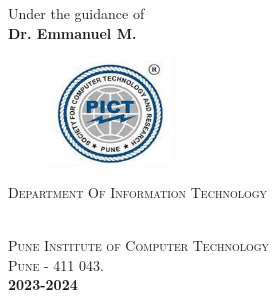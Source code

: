 \documentclass[12pt,a4paper]{report}     %
\begin{document}
	\begin{center}
	    {Under the guidance of }\\
	    {\textbf{Dr. Emmanuel M.}}  %
	\end{center}

		\vspace{0.075in}

	\begin{center}
	  \begin{figure}[h]
			\centering
			\includegraphics[scale=1.5]{pict_logo.png}
		\end{figure}
		\vspace{0.1cm}
	  \begin{large}\textsc {Department Of Information Technology} \end{large}\\
	  \textsc{Pune Institute of Computer Technology}\\
	  \textsc{Pune - 411 043.}\\
	      \textbf{2023-2024}
	\end{center}

\newpage
\pagestyle{plain}
\pagestyle{empty}
\pagestyle{fancy}							%
\renewcommand{\headrulewidth}{0pt}

		
\end{document}
